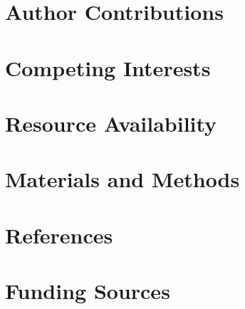 \documentclass[11pt]{elife} %
\begin{document}
\begin{fullwidth}
\section{Author Contributions}



\section{Competing Interests}



\section{Resource Availability}



\section{Materials and Methods}



\nocite{*} 

\section{References}



\section{Funding Sources}



\end{fullwidth}
\end{document}
